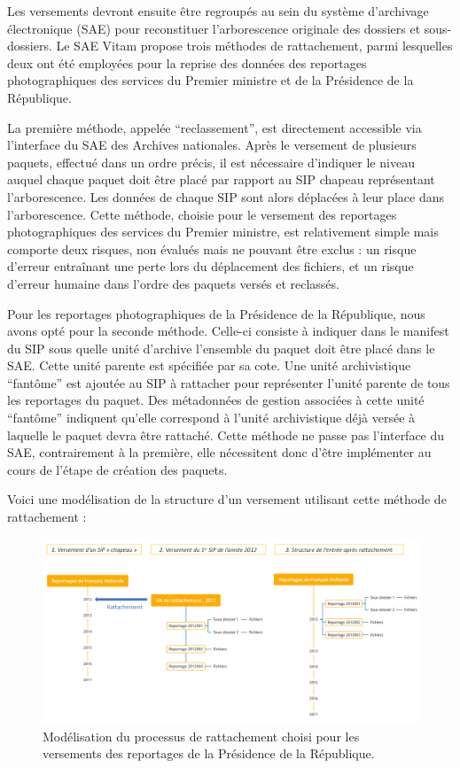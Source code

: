Les versements devront ensuite être regroupés au sein du système d'archivage électronique (SAE) pour reconstituer l'arborescence originale des dossiers et sous-dossiers. Le SAE Vitam propose trois méthodes de rattachement, parmi lesquelles deux ont été employées pour la reprise des données des reportages photographiques des services du Premier ministre et de la Présidence de la République.

La première méthode, appelée \enquote{reclassement}, est directement accessible via l'interface du SAE des Archives nationales. Après le versement de plusieurs paquets, effectué dans un ordre précis, il est nécessaire d’indiquer le niveau auquel chaque paquet doit être placé par rapport au SIP chapeau représentant l’arborescence. Les données de chaque SIP sont alors déplacées à leur place dans l'arborescence. Cette méthode, choisie pour le versement des reportages photographiques des services du Premier ministre, est relativement simple mais comporte deux risques, non évalués mais ne pouvant être exclus : un risque d'erreur entraînant une perte lors du déplacement des fichiers, et un risque d'erreur humaine dans l’ordre des paquets versés et reclassés.

Pour les reportages photographiques de la Présidence de la République, nous avons opté pour la seconde méthode. Celle-ci consiste à indiquer dans le manifest du SIP sous quelle unité d'archive l'ensemble du paquet doit être placé dans le SAE. Cette unité parente est spécifiée par sa cote. Une unité archivistique \enquote{fantôme} est ajoutée au SIP à rattacher pour représenter l’unité parente de tous les reportages du paquet. Des métadonnées de gestion associées à cette unité \enquote{fantôme} indiquent qu’elle correspond à l’unité archivistique déjà versée à laquelle le paquet devra être rattaché. Cette méthode ne passe pas l'interface du SAE, contrairement à la première, elle nécessitent donc d'être implémenter au cours de l'étape de création des paquets.

Voici une modélisation de la structure d'un versement utilisant cette méthode de rattachement :

\begin{figure}[h]
	\begin{adjustbox}{width = \textwidth, center}
		\includegraphics{./img/schema_rattachement.png}
	\end{adjustbox}
	\caption{Modélisation du processus de rattachement choisi pour les versements des reportages de la Présidence de la République.}
\end{figure}

